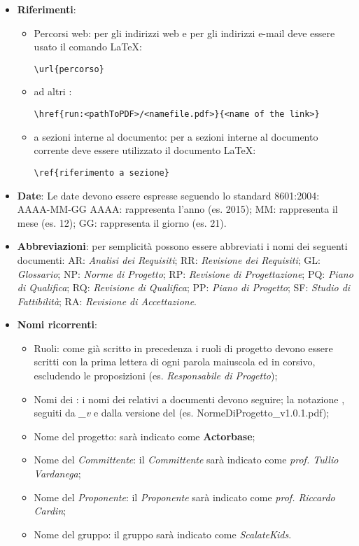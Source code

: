 \documentclass{scalatekids-article}
\begin{document}
\begin{itemize}
\item \textbf{Riferimenti}:
  \begin{itemize}
  \item Percorsi web: per gli indirizzi web e per gli indirizzi e-mail deve essere usato il comando \LaTeX\xspace:
    \begin{center}
      \verb=\url{percorso}=
    \end{center}
  \item {} ad altri :
    \begin{center}
      \verb=\href{run:<pathToPDF>/<namefile.pdf>}{<name of the link>}=
    \end{center}
  \item {} a sezioni interne al documento: per  a sezioni interne al documento corrente deve essere utilizzato il documento \LaTeX\xspace:
    \begin{center}
      \verb=\ref{riferimento a sezione}=
    \end{center}
  \end{itemize}
\item \textbf{Date}: Le date devono essere espresse seguendo lo standard \textit{} 8601:2004:
  AAAA-MM-GG
  AAAA: rappresenta l'anno (es. 2015);
  MM: rappresenta il mese (es. 12);
  GG: rappresenta il giorno (es. 21).

\item \textbf{Abbreviazioni}: per semplicità possono essere abbreviati i nomi dei seguenti documenti:
  AR: \textit{Analisi dei Requisiti};
  RR: \textit{Revisione dei Requisiti};
  GL: \textit{Glossario};
  NP: \textit{Norme di Progetto};
  RP: \textit{Revisione di Progettazione};
  PQ: \textit{Piano di Qualifica};
  RQ: \textit{Revisione di Qualifica};
  PP: \textit{Piano di Progetto};
  SF: \textit{Studio di Fattibilità};
  RA: \textit{Revisione di Accettazione}.

\item \textbf{Nomi ricorrenti}:
  \begin{itemize}
  \item Ruoli: come già scritto in precedenza i ruoli di progetto devono essere scritti con la prima lettera di ogni parola maiuscola ed in corsivo, escludendo le proposizioni (es. \textit{Responsabile di Progetto});
  \item Nomi dei : i nomi dei  relativi a documenti devono seguire;
    la notazione \textit{}, seguiti da \textit{\_v} e dalla
    versione del  (es. NormeDiProgetto\_v1.0.1.pdf);
  \item Nome del progetto: sarà indicato come \textbf{Actorbase};
  \item Nome del \textit{Committente}: il \textit{Committente} sarà indicato come \textit{prof. Tullio Vardanega};
  \item Nome del \textit{Proponente}: il \textit{Proponente} sarà indicato come \textit{prof. Riccardo Cardin};
  \item Nome del gruppo: il gruppo sarà indicato come \textit{ScalateKids}.
  \end{itemize}
\end{itemize}
\end{document}
